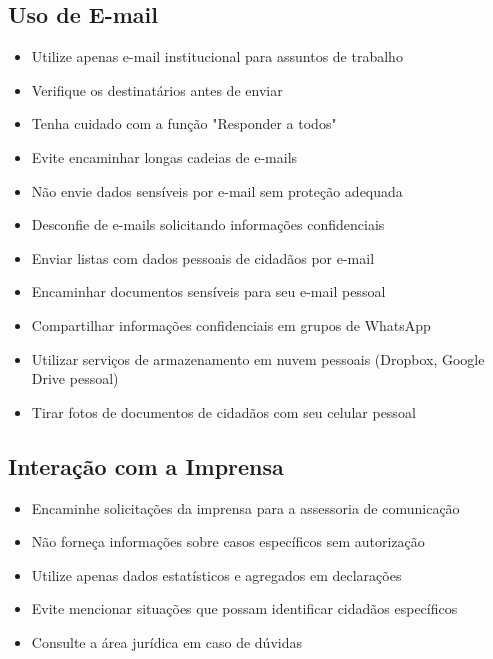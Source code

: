 \documentclass[12pt,a4paper]{article}
\begin{document}
\subsection{Uso de E-mail}
\begin{itemize}
    \item Utilize apenas e-mail institucional para assuntos de trabalho
    \item Verifique os destinatários antes de enviar
    \item Tenha cuidado com a função "Responder a todos"
    \item Evite encaminhar longas cadeias de e-mails
    \item Não envie dados sensíveis por e-mail sem proteção adequada
    \item Desconfie de e-mails solicitando informações confidenciais
\end{itemize}

\begin{tcolorbox}[colback=vermelhoclaro, colframe=red!75!black, title=Nunca Faça Isso]
\begin{itemize}
    \item Enviar listas com dados pessoais de cidadãos por e-mail
    \item Encaminhar documentos sensíveis para seu e-mail pessoal
    \item Compartilhar informações confidenciais em grupos de WhatsApp
    \item Utilizar serviços de armazenamento em nuvem pessoais (Dropbox, Google Drive pessoal)
    \item Tirar fotos de documentos de cidadãos com seu celular pessoal
\end{itemize}
\end{tcolorbox}

\subsection{Interação com a Imprensa}
\begin{itemize}
    \item Encaminhe solicitações da imprensa para a assessoria de comunicação
    \item Não forneça informações sobre casos específicos sem autorização
    \item Utilize apenas dados estatísticos e agregados em declarações
    \item Evite mencionar situações que possam identificar cidadãos específicos
    \item Consulte a área jurídica em caso de dúvidas
\end{itemize}
\end{document}
